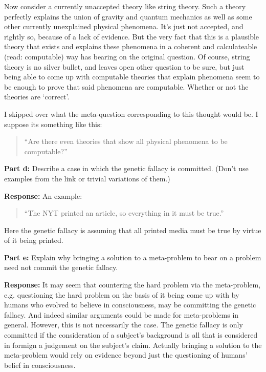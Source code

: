 \documentclass{article}
\begin{document}
Now consider a currently unaccepted theory like string theory. Such a theory perfectly explains the union of gravity and quantum mechanics as well as some other currently unexplained physical phenomena. It's just not accepted, and rightly so, because of a lack of evidence. But the very fact that this is a plausible theory that exists and explains these phenomena in a coherent and calculateable (read: computable) way has bearing on the original question. Of course, string theory is no silver bullet, and leaves open other question to be sure, but just being able to come up with computable theories that explain phenomena seem to be enough to prove that said phenomena are computable. Whether or not the theories are `correct'.

I skipped over what the meta-question corresponding to this thought would be. I suppose its something like this:
\begin{quote}
    ``Are there even theories that show all physical phenomena to be computable?''
\end{quote}
\bigskip

\noindent\textbf{Part d:} Describe a case in which the genetic fallacy is committed. (Don’t use examples from the link or trivial variations of them.)
\bigskip

\noindent\textbf{Response:} An example:
\begin{quote}
    ``The NYT printed an article, so everything in it must be true.''
\end{quote}

Here the genetic fallacy is assuming that all printed media must be true by virtue of it being printed.
\bigskip

\noindent\textbf{Part e:} Explain why bringing a solution to a meta-problem to bear on a problem need not commit the genetic fallacy.
\bigskip

\noindent\textbf{Response:} It may seem that countering the hard problem via the meta-problem, e.g. questioning the hard problem on the basis of it being come up with by humans who evolved to believe in consciousness, may be committing the genetic fallacy. And indeed similar arguments could be made for meta-problems in general. However, this is not necessarily the case. The genetic fallacy is only committed if the consideration of a subject's background is all that is considered in formign a judgement on the subject's claim. Actually bringing a solution to the meta-problem would rely on evidence beyond just the questioning of humans' belief in consciousness.
\bigskip
\end{document}
